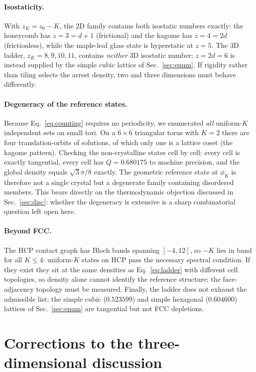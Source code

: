 \documentclass[11pt]{article}
\begin{document}
\paragraph{Isostaticity.} With $z_K = z_0-K$, the 2D family contains both
isostatic numbers exactly: the honeycomb has $z=3=d+1$ (frictional) and the
kagome has $z=4=2d$ (frictionless), while the maple-leaf glass state is
hyperstatic at $z=5$. The 3D ladder, $z_K=8,9,10,11$, contains \emph{neither}
3D isostatic number; $z=2d=6$ is instead supplied by the simple cubic lattice
of Sec.~\ref{sec:enum}. If rigidity rather than tiling selects the arrest
density, two and three dimensions must behave differently.

\paragraph{Degeneracy of the reference states.} Because
Eq.~\eqref{eq:counting} requires no periodicity, we enumerated \emph{all}
uniform-$K$ independent sets on small tori. On a $6\times6$ triangular torus
with $K=2$ there are four translation-orbits of solutions, of which only one is
a lattice coset (the kagome pattern). Checking the non-crystalline states cell
by cell: every cell is exactly tangential, every cell has
$Q=0.680175$ to machine precision, and the global density equals
$\sqrt3\pi/8$ exactly. The geometric reference state at $\phi_K$ is therefore
not a single crystal but a degenerate family containing disordered members.
This bears directly on the thermodynamic objection discussed in
Sec.~\ref{sec:disc}: whether the degeneracy is extensive is a sharp
combinatorial question left open here.

\paragraph{Beyond FCC.} The HCP contact graph has Bloch bands spanning
$[-4,12]$, so $-K$ lies in band for all $K\leq4$: uniform-$K$ states on HCP
pass the necessary spectral condition. If they exist they sit at the same
densities as Eq.~\eqref{eq:ladder} with different cell topologies, so density
alone cannot identify the reference structure; the face-adjacency topology must
be measured. Finally, the ladder does not exhaust the admissible list: the
simple cubic ($0.523599$) and simple hexagonal ($0.604600$) lattices of
Sec.~\ref{sec:enum} are tangential but not FCC depletions.

\section{Corrections to the three-dimensional discussion}
\label{sec:corrections}
\end{document}
